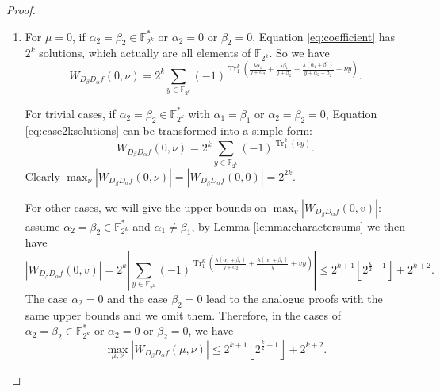 \documentclass{article}
\newcommand{\F}{\mathbb{F}}
\newcommand{\0}{\textbf{0}}
\newcommand{\1}{\textbf{1}}
\newcommand{\TRACE}{\operatorname{Tr}_1^k}
\theoremstyle{plain}
\begin{document}
\begin{proof}
        \begin{enumerate}[label=\textbf{Case \arabic*},wide = 0pt]
            \item For $\mu=0$, if $\alpha_2=\beta_2\in\F_{2^k}^*$ or $\alpha_2=0$ or $\beta_2=0$, Equation \eqref{eq:coefficient} has $2^k$ solutions, which actually are all elements of $\F_{2^k}$. 
            So we have
            \begin{equation}\label{eq:case2ksolutions}
                W_{D_{\beta}D_{\alpha}f}(0,\nu)=2^k\sum_{y\in\F_{2^k}}(-1)^{\TRACE\left(\frac{\lambda\alpha_1}{y+\alpha_2}+\frac{\lambda\beta_1}{y+\beta_2}+\frac{\lambda(\alpha_1+\beta_1)}{y+\alpha_2+\beta_2}+\nu y\right)}.
            \end{equation}

            For trivial cases, if $\alpha_2=\beta_2\in\F_{2^k}^*$ with $\alpha_1=\beta_1$ or $\alpha_2=\beta_2=0$, Equation \eqref{eq:case2ksolutions} can be transformed into a simple form:
            \[W_{D_{\beta}D_{\alpha}f}(0,\nu)=2^k\sum_{y\in\F_{2^k}}(-1)^{\TRACE\left(\nu y\right)}.\]
            Clearly $\max_{\nu}|W_{D_{\beta}D_{\alpha}f}(0,\nu)|=|W_{D_{\beta}D_{\alpha}f}(0,0)|=2^{2k}$.

            For other cases, we will give the upper bounds on $\max_{v}|W_{D_{\beta}D_{\alpha}f}(0,v)|$:
            assume $\alpha_2=\beta_2\in\F_{2^k}^*$ and $\alpha_1\ne\beta_1$, by Lemma \ref{lemma:charactersums} we then have
            \[\left\lvert W_{D_{\beta}D_{\alpha}f}(0,v)\right\rvert =2^k\left\lvert \sum_{y\in\F_{2^k}}(-1)^{\TRACE\left(\frac{\lambda(\alpha_1+\beta_1)}{y+\alpha_2}+\frac{\lambda(\alpha_1+\beta_1)}{y}+vy\right)}\right\rvert\le 2^{k+1}\left\lfloor 2^{\frac{k}{2}+1}\right\rfloor+2^{k+2}.\]
            The case $\alpha_2=0$ and the case $\beta_2=0$ lead to the analogue proofs with the same upper bounds and we omit them.
            Therefore, in the cases of $\alpha_2=\beta_2\in\F_{2^k}^*$ or $\alpha_2=0$ or $\beta_2=0$, we have
            \[\max_{\mu,\nu}|W_{D_{\beta}D_{\alpha}f}(\mu,\nu)|\le 2^{k+1}\left\lfloor 2^{\frac{k}{2}+1}\right\rfloor+2^{k+2}.\]


\end{enumerate}
\end{proof}
\end{document}
